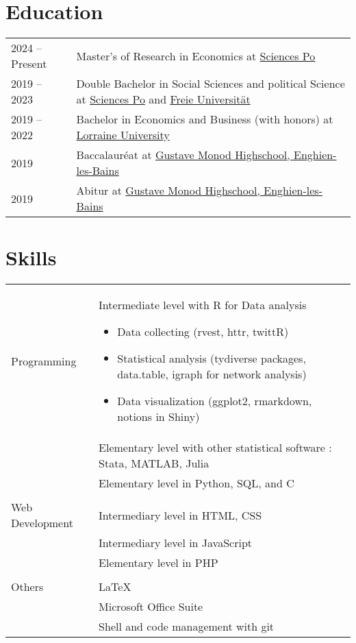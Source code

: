 \documentclass[a4paper,12pt]{article}
\begin{document}
\section{Education}
\begin{tabularx}{\linewidth}{@{}l X@{}}	

2024 – Present & Master’s of Research in Economics at \href{https://www.sciencespo.fr/en/}{Sciences Po} \\ 

2019 – 2023 & Double Bachelor in Social Sciences and political Science at \href{https://www.sciencespo.fr/fr/}{Sciences Po} and \hyperlink{https://www.fu-berlin.de/en/index.html}{Freie Universität}\\

2019 – 2022 & Bachelor in Economics and Business (with honors) at \href{https://www.univ-lorraine.fr/en}{Lorraine University}\\

2019 & Baccalauréat at \href{https://www.lyc-polyvalent-monod-enghien.fr/}{Gustave Monod Highschool, Enghien-les-Bains} \hfill \\

2019 & Abitur at \href{https://www.lyc-polyvalent-monod-enghien.fr/}{Gustave Monod Highschool, Enghien-les-Bains} \hfill \\

\end{tabularx}

\section{Skills}
\begin{tabularx}{\linewidth}{@{}l X@{}}
Programming & Intermediate level with R for Data analysis
\begin{itemize}
    \item Data collecting (rvest, httr, twittR)
    \item Statistical analysis (tydiverse packages, data.table, igraph for network analysis)
    \item Data visualization (ggplot2, rmarkdown, notions in Shiny)
\end{itemize} \\ 
& Elementary level with other statistical software : Stata, MATLAB, Julia \\
& Elementary level in Python, SQL, and C \\
& \\
Web Development  &  Intermediary level in HTML, CSS \\
& Intermediary level in JavaScript \\
& Elementary level in PHP\\
& \\
Others & \LaTeX \\
& Microsoft Office Suite \\
& Shell and code management with git \\
\end{tabularx}
\end{document}
